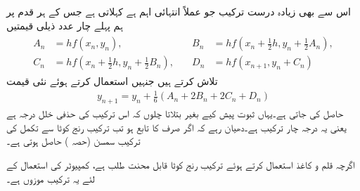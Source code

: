 اس سے بھی زیادہ درست ترکیب جو عملاً انتہائی اہم ہے  کہلاتی ہے جس کے ہر قدم پر ہم پہلے چار عدد ذیلی قیمتیں
\begin{gather}
\begin{aligned}\label{مساوات_اعدادی_رنج_کوٹا_الف}
A_n&=hf(x_n,y_n),\\
C_n&=hf(x_n+\tfrac{1}{2}h,y_n+\tfrac{1}{2}B_n),
\end{aligned}
\quad 
\begin{aligned}
B_n&=hf(x_n+\tfrac{1}{2}h,y_n+\tfrac{1}{2}A_n),\\
D_n&=hf(x_{n+1},y_n+C_n)
\end{aligned}
\end{gather}
 تلاش کرتے ہیں جنہیں استعمال کرتے ہوئے نئی قیمت
\begin{align}\label{مثال_اعدادی_ترکیب_یولر_ب}
y_{n+1}=y_n+\tfrac{1}{6}(A_n+2B_n+2C_n+D_n)
\end{align}
حاصل کی جاتی ہے۔یہاں ثبوت پیش کیے بغیر بتلاتا چلوں کہ اس ترکیب کی حذفی خلل درجہ  ہے یعنی یہ درجہ چار ترکیب  ہے۔دھیان رہے کہ اگر  صرف  کا تابع ہو تب ترکیب رنج کوٹا سے تکمل کی ترکیب سمسن (حصہ ) حاصل ہوتی ہے۔

اگرچہ قلم و کاغذ استعمال کرتے ہوئے ترکیب رنج کوٹا قابل محنت طلب ہے، کمپیوٹر کی استعمال کے لئے یہ ترکیب موزوں ہے۔

